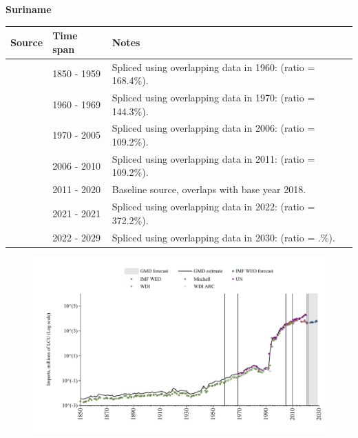 \documentclass[12pt,a4paper,landscape]{article}
\begin{document}
\begin{adjustbox}{max totalsize={\paperwidth}{\paperheight},center}
\begin{minipage}[t][\textheight][t]{\textwidth}
\vspace*{0.5cm}
{}
\begin{center}
{\Large\bfseries Suriname}
\end{center}
\vspace{0.5cm}
\begin{table}[H]
\centering
\small
\begin{tabular}{|l|l|l|}
\hline
\textbf{Source} & \textbf{Time span} & \textbf{Notes} \\
\hline
\rowcolor{white}\cite{Mitchell}& 1850 - 1959 &Spliced using overlapping data in 1960: (ratio = 168.4\%).\\
\rowcolor{lightgray}\cite{WDI_ARC}& 1960 - 1969 &Spliced using overlapping data in 1970: (ratio = 144.3\%).\\
\rowcolor{white}\cite{UN}& 1970 - 2005 &Spliced using overlapping data in 2006: (ratio = 109.2\%).\\
\rowcolor{lightgray}\cite{WDI}& 2006 - 2010 &Spliced using overlapping data in 2011: (ratio = 109.2\%).\\
\rowcolor{white}\cite{UN}& 2011 - 2020 &Baseline source, overlaps with base year 2018.\\
\rowcolor{lightgray}\cite{IMF_WEO}& 2021 - 2021 &Spliced using overlapping data in 2022: (ratio = 372.2\%).\\
\rowcolor{white}\cite{IMF_WEO_forecast}& 2022 - 2029 &Spliced using overlapping data in 2030: (ratio = .\%).\\
\hline
\end{tabular}
\end{table}
\begin{figure}[H]
\centering
\includegraphics[width=\textwidth,height=0.6\textheight,keepaspectratio]{graphs/SUR_imports.pdf}
\end{figure}
\end{minipage}
\end{adjustbox}
\end{document}
